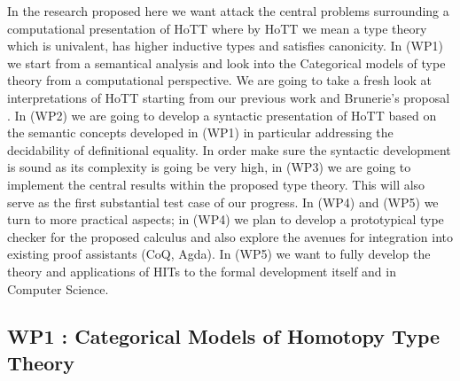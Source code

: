 \documentclass[twocolumn,a4paper,11pt]{article}
\begin{document}
In the research proposed here we want attack the central problems
surrounding a computational presentation of HoTT where by HoTT we mean
a type theory which is univalent, has higher inductive types and
satisfies canonicity.  In (WP1) we start from a semantical analysis
and look into the Categorical models of type theory from a
computational perspective. We are going to take a fresh look at
interpretations of HoTT starting from our previous work
\cite{altenRypacek:weakOmegaGrp} and Brunerie's proposal
\cite{brunerie13}.  In (WP2) we are going to develop a syntactic
presentation of HoTT based on the semantic concepts developed in (WP1)
in particular addressing the decidability of definitional equality.
In order make sure the syntactic development is sound as its
complexity is going be very high, in (WP3) we are going to implement
the central results within the proposed type theory. This will also
serve as the first substantial test case of our progress.  In (WP4)
and (WP5) we turn to more practical aspects; in (WP4) we plan to
develop a prototypical type checker for the proposed calculus and also
explore the avenues for integration into existing proof assistants
(CoQ, Agda). In (WP5) we want to fully develop the theory and
applications of HITs to the formal development itself and in Computer
Science.




\subsection*{WP1 : Categorical Models of Homotopy Type Theory}
\end{document}
